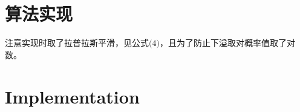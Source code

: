 \documentclass{ctexart}
\begin{document}

\section{算法实现}
%
%
注意实现时取了拉普拉斯平滑，见公式$\big(4\big)$，且为了防止下溢取对概率值取了对数。\cite{mcmc:Liu,stanf:cs229}
%
\section{Implementation}
\end{document}
